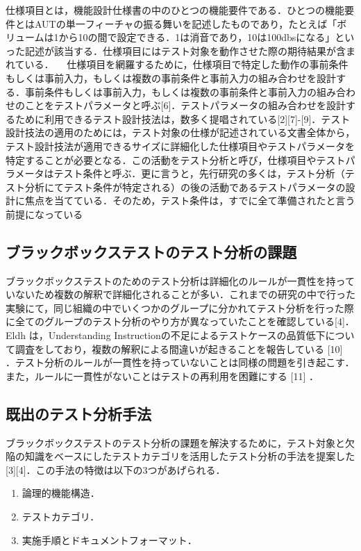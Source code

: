 \documentclass[a4paper,12pt]{jreport}
\begin{document}
仕様項目とは，機能設計仕様書の中のひとつの機能要件である．ひとつの機能要件とはAUTの単一フィーチャの振る舞いを記述したものであり，たとえば「ボリュームは1から10の間で設定できる．1は消音であり，10は100dbsになる」といった記述が該当する．仕様項目にはテスト対象を動作させた際の期待結果が含まれている．
　仕様項目を網羅するために，仕様項目で特定した動作の事前条件もしくは事前入力，もしくは複数の事前条件と事前入力の組み合わせを設計する．事前条件もしくは事前入力，もしくは複数の事前条件と事前入力の組み合わせのことをテストパラメータと呼ぶ[6]．テストパラメータの組み合わせを設計するために利用できるテスト設計技法は，数多く提唱されている[2][7]-[9]．テスト設計技法の適用のためには，テスト対象の仕様が記述されている文書全体から，テスト設計技法が適用できるサイズに詳細化した仕様項目やテストパラメータを特定することが必要となる．この活動をテスト分析と呼び，仕様項目やテストパラメータはテスト条件と呼ぶ．更に言うと，先行研究の多くは，テスト分析（テスト分析にてテスト条件が特定される）の後の活動であるテストパラメータの設計に焦点を当てている．そのため，テスト条件は，すでに全て準備されたと言う前提になっている

\subsection{ブラックボックステストのテスト分析の課題}
ブラックボックステストのためのテスト分析は詳細化のルールが一貫性を持っていないため複数の解釈で詳細化されることが多い．これまでの研究の中で行った実験にて，同じ組織の中でいくつかのグループに分かれてテスト分析を行った際に全てのグループのテスト分析のやり方が異なっていたことを確認している[4]．Eldh は，Understanding Instructionの不足によるテストケースの品質低下について調査をしており，複数の解釈による間違いが起きることを報告している [10] ．テスト分析のルールが一貫性を持っていないことは同様の問題を引き起こす．また，ルールに一貫性がないことはテストの再利用を困難にする [11] ．

\subsection{既出のテスト分析手法}
ブラックボックステストのテスト分析の課題を解決するために，テスト対象と欠陥の知識をベースにしたテストカテゴリを活用したテスト分析の手法を提案した[3][4]．この手法の特徴は以下の3つがあげられる．

\begin{enumerate}
\item 論理的機能構造．
\item テストカテゴリ．
\item 実施手順とドキュメントフォーマット．
\end{enumerate}
\end{document}
